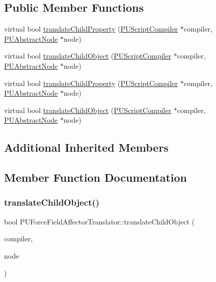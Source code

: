 \subsection*{Public Member Functions}
\begin{DoxyCompactItemize}
\item 
virtual bool \hyperlink{classPUForceFieldAffectorTranslator_af3d48aa10615a215967a66e0e0f61de2}{translate\+Child\+Property} (\hyperlink{classPUScriptCompiler}{P\+U\+Script\+Compiler} $\ast$compiler, \hyperlink{classPUAbstractNode}{P\+U\+Abstract\+Node} $\ast$node)
\item 
virtual bool \hyperlink{classPUForceFieldAffectorTranslator_a4ccedda90de95083e62647e980b6e3cc}{translate\+Child\+Object} (\hyperlink{classPUScriptCompiler}{P\+U\+Script\+Compiler} $\ast$compiler, \hyperlink{classPUAbstractNode}{P\+U\+Abstract\+Node} $\ast$node)
\item 
virtual bool \hyperlink{classPUForceFieldAffectorTranslator_ad0aa1f0eb7ff0e7184d943e8568b718a}{translate\+Child\+Property} (\hyperlink{classPUScriptCompiler}{P\+U\+Script\+Compiler} $\ast$compiler, \hyperlink{classPUAbstractNode}{P\+U\+Abstract\+Node} $\ast$node)
\item 
virtual bool \hyperlink{classPUForceFieldAffectorTranslator_aba702f56eed25b88fd27ffc1bf813c80}{translate\+Child\+Object} (\hyperlink{classPUScriptCompiler}{P\+U\+Script\+Compiler} $\ast$compiler, \hyperlink{classPUAbstractNode}{P\+U\+Abstract\+Node} $\ast$node)
\end{DoxyCompactItemize}
\subsection*{Additional Inherited Members}


\subsection{Member Function Documentation}
\mbox{\label{classPUForceFieldAffectorTranslator_a4ccedda90de95083e62647e980b6e3cc}} 
\subsubsection{\texorpdfstring{translate\+Child\+Object()}{translateChildObject()}\hspace{0.1cm}{\footnotesize\ttfamily [1/2]}}
{\footnotesize\ttfamily bool P\+U\+Force\+Field\+Affector\+Translator\+::translate\+Child\+Object (\begin{DoxyParamCaption}\item[{\hyperlink{classPUScriptCompiler}{P\+U\+Script\+Compiler} $\ast$}]{compiler,  }\item[{\hyperlink{classPUAbstractNode}{P\+U\+Abstract\+Node} $\ast$}]{node }\end{DoxyParamCaption})\hspace{0.3cm}{\ttfamily [virtual]}}

